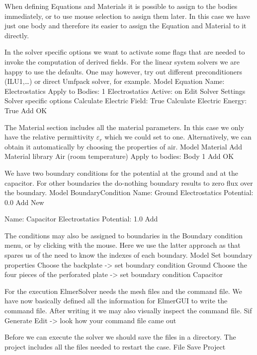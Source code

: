 When defining Equations and Materials it is possible to assign to the bodies immediately, or to use mouse
selection to assign them later. In this case we have just one body and therefore its easier to assign 
the Equation and Material to it directly.

In the solver specific options we want to activate some flags that are needed to invoke the 
computation of derived fields. 
For the linear system solvers we are happy to use the defaults. One may however, try out different
preconditioners (ILU1,\ldots) or direct Umfpack solver, for example.
\ttbegin
Model
  Equation
    Name: Electrostatics
    Apply to Bodies: 1
    Electrostatics
      Active: on
      Edit Solver Settings
        Solver specific options
          Calculate Electric Field:     True
          Calculate Electric Energy:    True
    Add 
    OK
\ttend        

The Material section includes all the material parameters.
In this case we only have the relative permittivity $\varepsilon_r$ which we could set to one.
Alternatively, we can obtain it automatically by choosing the properties of air. 
\ttbegin
Model
  Material
    Add 
      Material library
        Air (room temperature)
      Apply to bodies: Body 1 
      Add 
      OK
\ttend


We have two boundary conditions for the potential at the ground and at the capacitor. For other boundaries the do-nothing boundary results to zero flux over the boundary.
\ttbegin
Model
  BoundaryCondition
    Name: Ground
    Electrostatics
      Potential: 0.0
    Add
    New

    Name: Capacitor
    Electrostatics
      Potential: 1.0
    Add
\ttend   

The conditions may also be assigned to boundaries in the Boundary condition menu, or 
by clicking with the mouse. Here we use the latter approach as that spares us of the 
need to know the indexes of each boundary.
\ttbegin
Model
  Set boundary properties
    Choose the backplate -> set boundary condition Ground
    Choose the four pieces of the perforated plate -> set boundary condition Capacitor
\ttend

For the execution 
ElmerSolver needs the mesh files and the command file. We have now basically defined
all the information for ElmerGUI to write the command file. After writing it we may also visually 
inspect the command file.
\ttbegin
Sif 
  Generate
  Edit -> look how your command file came out  
\ttend

Before we can execute the solver we should save the files in a directory. The project includes
all the files needed to restart the case.
\ttbegin
File 
  Save Project
\ttend

